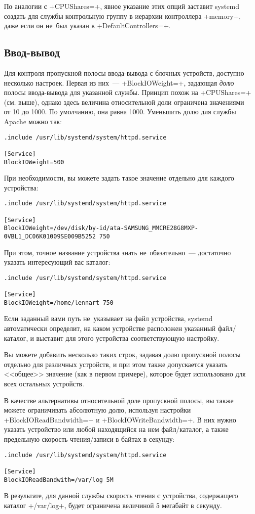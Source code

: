 \documentclass[10pt,oneside,a4paper]{article}
\begin{document}
По аналогии с +CPUShares=+, явное указание этих опций заставит systemd создать
для службы контрольную группу в иерархии контроллера +memory+, даже если он
не~был указан в +DefaultControllers=+.

\subsection{Ввод-вывод}

Для контроля пропускной полосы ввода-вывода с блочных устройств, доступно
несколько настроек. Первая из них~--- +BlockIOWeight=+, задающая \emph{долю} полосы
ввода-вывода для указанной службы. Принцип похож на +CPUShares=+ (см. выше), однако
здесь величина относительной доли ограничена значениями от 10 до 1000. По
умолчанию, она равна 1000. Уменьшить долю для службы Apache можно так:
\begin{Verbatim}
.include /usr/lib/systemd/system/httpd.service

[Service]
BlockIOWeight=500
\end{Verbatim}

При необходимости, вы можете задать такое значение отдельно для каждого
устройства:
\begin{Verbatim}
.include /usr/lib/systemd/system/httpd.service

[Service]
BlockIOWeight=/dev/disk/by-id/ata-SAMSUNG_MMCRE28G8MXP-0VBL1_DC06K01009SE009B5252 750
\end{Verbatim}

При этом, точное название устройства знать не~обязательно~--- достаточно указать
интересующий вас каталог:
\begin{Verbatim}
.include /usr/lib/systemd/system/httpd.service

[Service]
BlockIOWeight=/home/lennart 750
\end{Verbatim}
Если заданный вами путь не~указывает на файл устройства, systemd автоматически
определит, на каком устройстве расположен указанный файл/каталог, и выставит для
этого устройства соответствующую настройку.

Вы можете добавить несколько таких строк, задавая долю пропускной полосы
отдельно для различных устройств, и при этом также допускается указать <<общее>>
значение (как в первом примере), которое будет использовано для всех остальных
устройств.

В качестве альтернативы относительной доле пропускной полосы, вы также можете
ограничивать абсолютную долю, используя настройки +BlockIOReadBandwidth=+ и
+BlockIOWriteBandwidth=+. В них нужно указать устройство или любой находящийся
на нем файл/каталог, а также предельную скорость чтения/записи в байтах в
секунду:
\begin{Verbatim}
.include /usr/lib/systemd/system/httpd.service

[Service]
BlockIOReadBandwith=/var/log 5M
\end{Verbatim}
В результате, для данной службы скорость чтения с устройства, содержащего
каталог +/var/log+, будет ограничена величиной 5 мегабайт в секунду.
\end{document}
